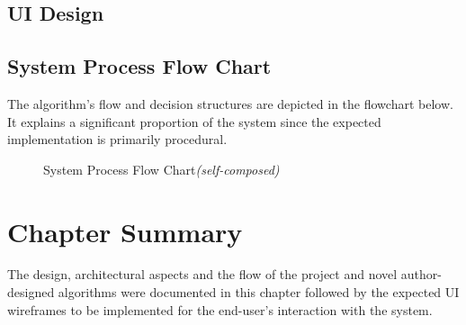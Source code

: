 




\subsection{UI Design}

\pagebreak
\subsection{System Process Flow Chart}
The algorithm's flow and decision structures are depicted in the flowchart below. It explains a significant proportion of the system since the expected implementation is primarily procedural.

\begin{figure}[h!]
\centering
\setlength{\fboxsep}{10pt}%
\setlength{\fboxrule}{0.5pt}%
\caption{System Process Flow Chart\textit{(self-composed)}}
\label{fig:system-process-flowchart}
\end{figure}


\section{Chapter Summary}
The design, architectural aspects and the flow of the project and novel author-designed algorithms were documented in this chapter followed by the expected UI wireframes to be implemented for the end-user's interaction with the system.

